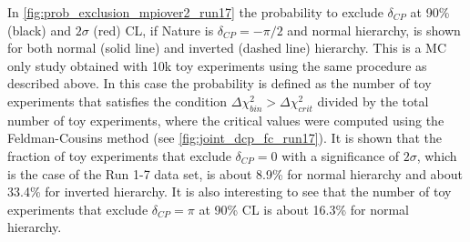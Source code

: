 %


In \cref{fig:prob_exclusion_mpiover2_run17} 
the probability to exclude $\delta_{CP}$ at 90\% (black) and $2\sigma$ (red) CL, 
if Nature is $\delta_{CP}=-\pi/2$ and normal hierarchy, is shown
for both normal (solid line) and inverted (dashed line) hierarchy.
This is a MC only study obtained with 10k toy experiments using
the same procedure as described above.
In this case the probability is defined as the number of toy experiments
that satisfies the condition $\Delta \chi^2_{bin} > \Delta \chi^2_{crit}$
divided by the total number of toy experiments,
where the critical values were computed using the Feldman-Cousins method
(see \cref{fig:joint_dcp_fc_run17}).
It is shown that the fraction of toy experiments that exclude $\delta_{CP}=0$
with a significance of $2\sigma$,
which is the case of the Run 1-7 data set,  
is about 8.9\%
for normal hierarchy and about 33.4\% for inverted hierarchy.
It is also interesting to see that the 
number of toy experiments that exclude $\delta_{CP} = \pi$
at 90\% CL is about 16.3\% for normal hierarchy.

